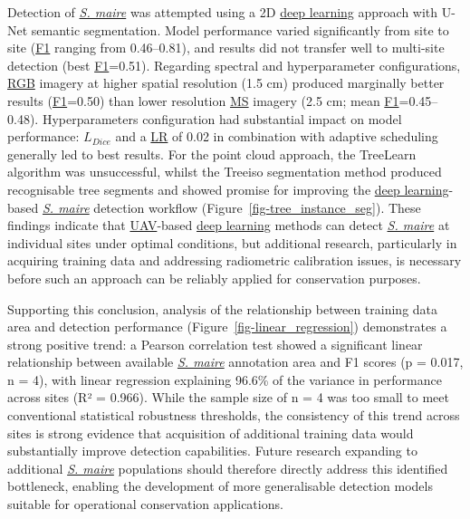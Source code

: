 \documentclass[
]{scrreprt}
\begin{document}
Detection of \hyperref[acronyms_SM]{\emph{S. maire}} was attempted using
a 2D \hyperref[acronyms_DL]{deep learning} approach with U-Net semantic
segmentation. Model performance varied significantly from site to site
(\hyperref[acronyms_F1]{F1} ranging from 0.46--0.81), and results did
not transfer well to multi-site detection (best
\hyperref[acronyms_F1]{F1}=0.51). Regarding spectral and hyperparameter
configurations, \hyperref[acronyms_RGB]{RGB} imagery at higher spatial
resolution (1.5 cm) produced marginally better results
(\hyperref[acronyms_F1]{F1}=0.50) than lower resolution
\hyperref[acronyms_MS]{MS} imagery (2.5 cm; mean
\hyperref[acronyms_F1]{F1}=0.45--0.48). Hyperparameters configuration
had substantial impact on model performance:
\hyperref[acronyms_DICE]{\(L_{Dice}\)} and a \hyperref[acronyms_LR]{LR}
of 0.02 in combination with adaptive scheduling generally led to best
results. For the point cloud approach, the TreeLearn algorithm was
unsuccessful, whilst the Treeiso segmentation method produced
recognisable tree segments and showed promise for improving the
\hyperref[acronyms_DL]{deep learning}-based
\hyperref[acronyms_SM]{\emph{S. maire}} detection workflow
(Figure~\ref{fig-tree_instance_seg}). These findings indicate that
\hyperref[acronyms_UAV]{UAV}-based \hyperref[acronyms_DL]{deep learning}
methods can detect \hyperref[acronyms_SM]{\emph{S. maire}} at individual
sites under optimal conditions, but additional research, particularly in
acquiring training data and addressing radiometric calibration issues,
is necessary before such an approach can be reliably applied for
conservation purposes.

Supporting this conclusion, analysis of the relationship between
training data area and detection performance
(Figure~\ref{fig-linear_regression}) demonstrates a strong positive
trend: a Pearson correlation test showed a significant linear
relationship between available \hyperref[acronyms_SM]{\emph{S. maire}}
annotation area and F1 scores (p = 0.017, n = 4), with linear regression
explaining 96.6\% of the variance in performance across sites (R² =
0.966). While the sample size of n = 4 was too small to meet
conventional statistical robustness thresholds, the consistency of this
trend across sites is strong evidence that acquisition of additional
training data would substantially improve detection capabilities. Future
research expanding to additional \hyperref[acronyms_SM]{\emph{S. maire}}
populations should therefore directly address this identified
bottleneck, enabling the development of more generalisable detection
models suitable for operational conservation applications.
\end{document}
